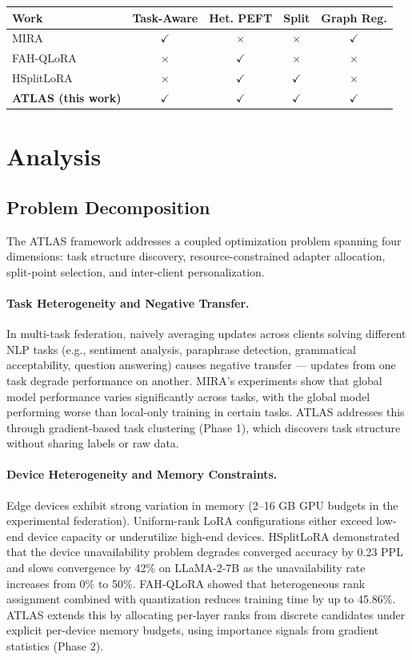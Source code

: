 \documentclass[11pt,a4paper]{article}
\begin{document}
\begin{center}
\begin{tabular}{lcccc}
\toprule
\textbf{Work} & \textbf{Task-Aware} & \textbf{Het. PEFT} & \textbf{Split} & \textbf{Graph Reg.}\\
\midrule
MIRA & $\checkmark$ & $\times$ & $\times$ & $\checkmark$\\
FAH-QLoRA & $\times$ & $\checkmark$ & $\times$ & $\times$\\
HSplitLoRA & $\times$ & $\checkmark$ & $\checkmark$ & $\times$\\
\textbf{ATLAS (this work)} & $\checkmark$ & $\checkmark$ & $\checkmark$ & $\checkmark$\\
\bottomrule
\end{tabular}
\end{center}


\section{Analysis}

\subsection{Problem Decomposition}

The ATLAS framework addresses a coupled optimization problem spanning four dimensions: task structure discovery, resource-constrained adapter allocation, split-point selection, and inter-client personalization.

\paragraph{Task Heterogeneity and Negative Transfer.}
In multi-task federation, naively averaging updates across clients solving different NLP tasks (e.g., sentiment analysis, paraphrase detection, grammatical acceptability, question answering) causes negative transfer --- updates from one task degrade performance on another. MIRA's experiments show that global model performance varies significantly across tasks, with the global model performing worse than local-only training in certain tasks. ATLAS addresses this through gradient-based task clustering (Phase 1), which discovers task structure without sharing labels or raw data.

\paragraph{Device Heterogeneity and Memory Constraints.}
Edge devices exhibit strong variation in memory (2--16 GB GPU budgets in the experimental federation). Uniform-rank LoRA configurations either exceed low-end device capacity or underutilize high-end devices. HSplitLoRA demonstrated that the device unavailability problem degrades converged accuracy by 0.23 PPL and slows convergence by 42\% on LLaMA-2-7B as the unavailability rate increases from 0\% to 50\%. FAH-QLoRA showed that heterogeneous rank assignment combined with quantization reduces training time by up to 45.86\%. ATLAS extends this by allocating per-layer ranks from discrete candidates under explicit per-device memory budgets, using importance signals from gradient statistics (Phase 2).
\end{document}

